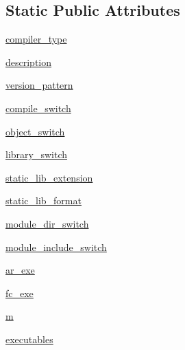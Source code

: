 \subsection*{Static Public Attributes}
\begin{DoxyCompactItemize}
\item 
\hyperlink{classnumpy_1_1distutils_1_1fcompiler_1_1compaq_1_1CompaqVisualFCompiler_aeb990bb466c5cde399145e0e91fd1a1b}{compiler\+\_\+type}
\item 
\hyperlink{classnumpy_1_1distutils_1_1fcompiler_1_1compaq_1_1CompaqVisualFCompiler_adbc1481262013e8bb5bc0d8fe02b51a1}{description}
\item 
\hyperlink{classnumpy_1_1distutils_1_1fcompiler_1_1compaq_1_1CompaqVisualFCompiler_af4006e108a144e90e9bba35bb90d78b3}{version\+\_\+pattern}
\item 
\hyperlink{classnumpy_1_1distutils_1_1fcompiler_1_1compaq_1_1CompaqVisualFCompiler_ab970a2611c3a8fd652afb1efd7b6ed70}{compile\+\_\+switch}
\item 
\hyperlink{classnumpy_1_1distutils_1_1fcompiler_1_1compaq_1_1CompaqVisualFCompiler_ad7b14819e0d8f3e1faa40e2446292a57}{object\+\_\+switch}
\item 
\hyperlink{classnumpy_1_1distutils_1_1fcompiler_1_1compaq_1_1CompaqVisualFCompiler_a89a30d4f6c51ffed24bf2adbdf0e61f5}{library\+\_\+switch}
\item 
\hyperlink{classnumpy_1_1distutils_1_1fcompiler_1_1compaq_1_1CompaqVisualFCompiler_ad854481227f4fb2da78b13a9b6ce5ac5}{static\+\_\+lib\+\_\+extension}
\item 
\hyperlink{classnumpy_1_1distutils_1_1fcompiler_1_1compaq_1_1CompaqVisualFCompiler_ac0643e455f6156cc5a3e7edb084c6871}{static\+\_\+lib\+\_\+format}
\item 
\hyperlink{classnumpy_1_1distutils_1_1fcompiler_1_1compaq_1_1CompaqVisualFCompiler_a880b35a3bbeac0ce66ac61787005c0a0}{module\+\_\+dir\+\_\+switch}
\item 
\hyperlink{classnumpy_1_1distutils_1_1fcompiler_1_1compaq_1_1CompaqVisualFCompiler_a7625b1c3e90c32d263b89b3b7d720682}{module\+\_\+include\+\_\+switch}
\item 
\hyperlink{classnumpy_1_1distutils_1_1fcompiler_1_1compaq_1_1CompaqVisualFCompiler_a90ddd479d38245f4ad6bb2414d65f824}{ar\+\_\+exe}
\item 
\hyperlink{classnumpy_1_1distutils_1_1fcompiler_1_1compaq_1_1CompaqVisualFCompiler_a637094b359cb37498d8b0a29b1c5ec86}{fc\+\_\+exe}
\item 
\hyperlink{classnumpy_1_1distutils_1_1fcompiler_1_1compaq_1_1CompaqVisualFCompiler_ac9ad48325f1a208e45ba629ed7112d5d}{m}
\item 
\hyperlink{classnumpy_1_1distutils_1_1fcompiler_1_1compaq_1_1CompaqVisualFCompiler_acb9f863431ff1f5b4835b3057de8e786}{executables}
\end{DoxyCompactItemize}


